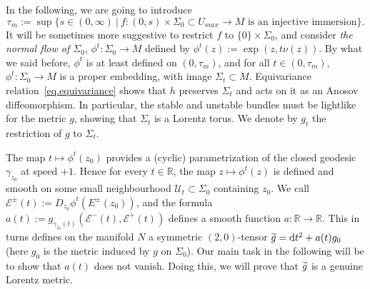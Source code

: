 \documentclass[11pt]{article}
\theoremstyle{definition}
\numberwithin{equation}{section}
\numberwithin{figure}{section}
\numberwithin{table}{section}
\newcommand*\RR{\mathbb{R}}
\let\oldtilde\tilde
\renewcommand*\tilde[1]{\mathchoice{\widetilde{#1}}{\widetilde{#1}}{\widetilde{#1}}{\oldtilde{#1}}}
\newcommand*{\dd}{\mathrm{d}}
\newcommand*{\dt}{\dd t}
\begin{document}
In the following, we are going to introduce
\[
\tau_m := \sup\{ s \in (0,\infty) \ | \ f:(0,s) \times \Sigma_0 \subset U_{max} \to M
\text{ is an injective immersion}\}.
\]
It will be sometimes more suggestive to restrict $f$ to $\{0\} \times \Sigma_0$, and consider \emph{the normal flow of $\Sigma_0$}, $\phi^t: \Sigma_0 \to M$ defined by $\phi^t(z):=\exp(z,t \nu(z))$. By what we said before, $\phi^t$ is at least defined on $(0,\tau_m)$, and for all $t \in (0,\tau_m)$, $\phi^t: \Sigma_0 \to M$ is a proper embedding, with image $\Sigma_t \subset M$. Equivariance relation~\eqref{eq.equivariance} shows that $h$ preserves $\Sigma_t$ and acts on it as an Anosov diffeomorphism. In particular, the stable and unstable bundles must be lightlike for the metric $g$, showing that $\Sigma_t$ is a Lorentz torus. We denote by $g_t$ the restriction of $g$ to $\Sigma_t$.



The map $t \mapsto \phi^t(z_0)$ provides a (cyclic) parametrization of the closed geodesic $\gamma_{z_0}$ at speed $+1$. Hence for every $t \in \RR$, the map $z \mapsto \phi^t(z)$ is defined and smooth on some small neighbourhood ${\mathcal U_t} \subset \Sigma_0$ containing $z_0$. We call ${\mathcal E}^{\pm}(t):=D_{z_0}\phi^t(E^{\pm}(z_0))$, and the formula $a(t):=g_{\gamma_{z_0}(t)}({\mathcal E}^{-}(t),{\mathcal E}^{+}(t))$ defines a smooth function $a: \RR \to \RR$. This in turns defines on the manifold $N$ a symmetric $(2,0)$-tensor $\tilde{g}=\dt^2+a(t)g_{0}$ (here $g_0$ is the metric induced by $g$ on $\Sigma_0$). Our main task in the following will be to show that $a(t)$ does not vanish. Doing this, we will prove that $\tilde{g}$ is a genuine Lorentz metric.
\end{document}
